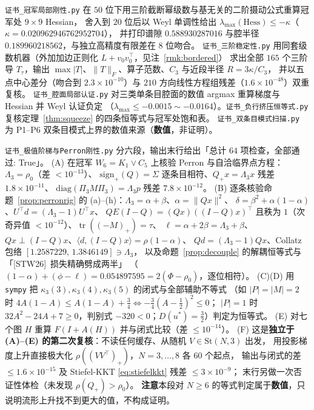 \documentclass[UTF8,11pt]{ctexart}
\theoremstyle{definition}
\newcommand{\Lam}{\Lambda}
\newcommand{\tr}{\operatorname{tr}}
\newcommand{\STW}{\textup{[STW26]}}
\begin{document}
\texttt{证书\_冠军局部刚性.py} 在 $50$ 位下用三阶截断幂级数与基无关的二阶摄动公式重算冠军处 $9\times9$ Hessian，
舍入到 $20$ 位后以 Weyl 单调性给出 $\lambda_{\max}(\mathrm{Hess})\le-\kappa$（$\kappa=0.020962946762952704$），
并打印谱隙 $0.588930287016$ 与腔半径 $0.189960218562$，与独立高精度有限差在 $8$ 位吻合。
\texttt{证书\_三阶稳定性.py} 用同套级数机器（外加加边正则化 $L+v_0v_0^\top$，见注~\ref{rmk:bordered}）
求出全部 $165$ 个三阶导 $T_\tau$，输出 $\max|T|$、$\|T\|_F$、算子范数、$C_3$ 与近段半径 $R=3\kappa/C_3$，
并以五点中心差分（吻合到 $2.3\times10^{-10}$）与 $210$ 方向线性方程组残差（$1.6\times10^{-48}$）双重复核。
\texttt{证书\_腔面局部认证.py} 对三类单条目腔面的数值 argmax 重算梯度与 Hessian 并 Weyl 认证负定
（$\lambda_{\max}\le-0.0015\sim-0.0164$）。\texttt{证书\_负行挤压恒等式.py} 复核定理~\ref{thm:squeeze} 的四条恒等式与冠军处饱和表。
\texttt{证书\_双条目模式扫描.py} 为 P1--P6 双条目模式上界的数值来源（\textbf{数值}，非证明）。

\texttt{证书\_极值阶梯与Perron刚性.py} 分六段，输出末行给出「总计 $64$ 项检查，全部通过: True」。
(A) 在冠军 $W_6=K_1\vee C_5$ 上核验 Perron 与自洽临界点方程：$\Lam_3=\rho_0$（差 $<10^{-13}$）、
$\mathrm{sign}_+(Q)=\Sigma$ 逐条目相符、$Q_+x=\Lam_3x$ 残差 $1.8\times10^{-11}$、
$\mathrm{diag}(\Pi_3M\Pi_3)=\Lam_3p$ 残差 $7.8\times10^{-12}$。
(B) 逐条核验命题~\ref{prop:perronrig} 的 (a)--(h)：$\Lam_3=\alpha+\beta$、$\alpha=\|Qx\|^2$、
$\delta=\beta^2+\alpha(1-\alpha)$、$U^\top d=(\Lam_3-1)U^\top x$、
$QE(I-Q)=(Qx)((I-Q)x)^\top$ 且秩为 $1$（次奇异值 $<10^{-12}$）、$\tr((-M)_+)=\tau$、
$\ell=\alpha+2\beta=\Lam_3+\beta$、$Qx\perp(I-Q)x$、$\langle d,(I-Q)x\rangle=\rho(1-\alpha)$、
$Qd=(\Lam_3-1)Qx$、Collatz 包络 $[1.2587229,\,1.3846149]\ni\Lam_3$，
以及命题~\ref{prop:decouple} 的解耦恒等式与「\STW\ 损失精确劈成两半」
（$(1-\alpha)+(\phi-\ell)=0.054897595=2(\Phi-\rho_0)$，逐位相符）。
(C)(D) 用 \texttt{sympy} 把 $\kappa_3(3),\kappa_3(4),\kappa_3(5)$ 的闭式与全部辅助不等式
（如 $|P|=|M|=2$ 时 $4A(1-A)\le A(1-A)+\frac34\iff-\frac34(A-\frac12)^2\le0$；
$|P|=1$ 时 $32A^2-24A+7\ge0$，判别式 $-320<0$；$D(u^*)=\frac32$）判定为恒等式。
(E) 对七个图 $H$ 重算 $F(I+A(H))$ 并与闭式比较（差 $\le10^{-14}$）。
(F) 这是\textbf{独立于 (A)--(E) 的第二次复核}：不读任何缓存、从随机 $V\in\mathrm{St}(N,3)$ 出发，
用投影梯度上升直接极大化 $\rho((VV^\top)_+)$，$N=3,\dots,8$ 各 $60$ 个起点，
输出与闭式的差 $\le1.6\times10^{-15}$ 及 Stiefel-KKT \eqref{eq:stiefelkkt} 残差 $\le3\times10^{-9}$；
末行另做一次否证性体检（未发现 $\rho(Q_+)>\rho_0$）。
\textbf{注意}本段对 $N\ge6$ 的等式判定属于\textbf{数值}，只说明流形上升找不到更大的值，不构成证明。
\end{document}
